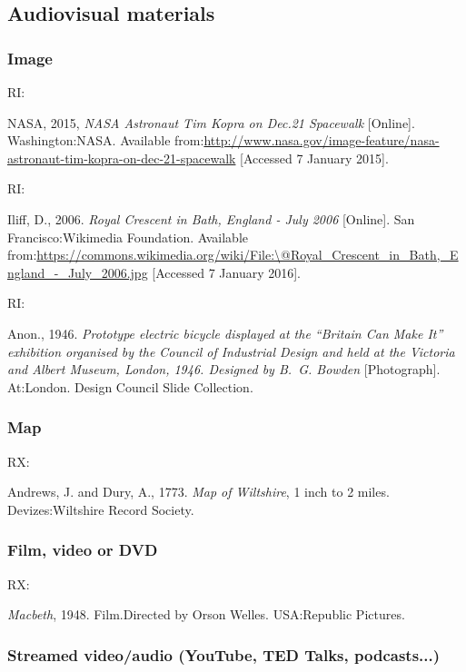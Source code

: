 \subsection{Audiovisual materials}

\subsubsection*{Image}

RI: \cite{nasa2015nat}

NASA, 2015, \emph{NASA Astronaut Tim Kopra on Dec.\@ 21 Spacewalk} [Online]. Washington:\@ NASA. Available from:\@ \url{http://www.nasa.gov/image-feature/nasa-astronaut-tim-kopra-on-dec-21-spacewalk} [Accessed 7 January 2015].


RI: \cite{iliff2006rcb}

Iliff, D., 2006. \emph{Royal Crescent in Bath, England - July 2006} [Online]. San Francisco:\@ Wikimedia Foundation. Available from:\@ \url{https://commons.wikimedia.org/wiki/File:\@Royal_Crescent_in_Bath,_England_-_July_2006.jpg} [Accessed 7 January 2016].


RI: \cite{anon1946peb}

Anon., 1946. \emph{Prototype electric bicycle displayed at the \enquote{Britain Can Make It} exhibition organised by the Council of Industrial Design and held at the Victoria and Albert Museum, London, 1946. Designed by B.~G. Bowden} [Photograph]. At:\@ London. Design Council Slide Collection.



\subsubsection*{Map}

RX: \cite{andrews.dury1773wilts}

Andrews, J. and Dury, A., 1773. \emph{Map of Wiltshire}, 1 inch to 2 miles. Devizes:\@ Wiltshire Record Society.



\subsubsection*{Film, video or DVD}

RX: \cite{macbeth1948}

\emph{Macbeth}, 1948. Film.\@ Directed by Orson Welles. USA:\@ Republic Pictures.



\subsubsection*{Streamed video/audio (YouTube, TED Talks, podcasts...)}

